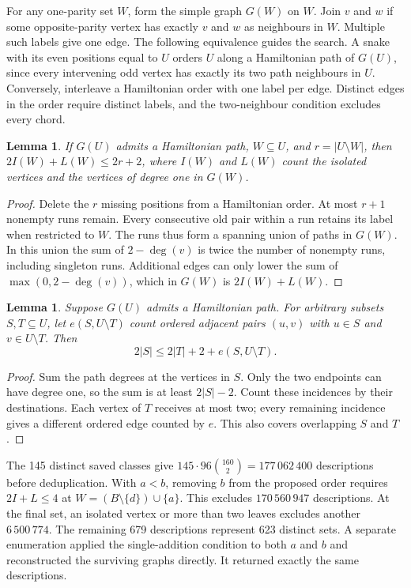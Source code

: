 \documentclass[11pt,a4paper]{article}
\newtheorem{lemma}[theorem]{Lemma}
\theoremstyle{definition}
\theoremstyle{remark}
\begin{document}
For any one-parity set $W$, form the simple graph $G(W)$ on $W$.
Join $v$ and $w$ if some opposite-parity vertex has exactly $v$ and $w$
as neighbours in $W$. Multiple such labels give one edge.
The following equivalence guides the search. A snake
with its even positions equal to $U$ orders $U$ along a Hamiltonian
path of $G(U)$, since every intervening odd vertex has exactly its two
path neighbours in $U$. Conversely, interleave a Hamiltonian order
with one label per edge. Distinct edges in the order require distinct
labels, and the two-neighbour condition excludes every chord.

\begin{lemma}\label{lem:partial237}
If $G(U)$ admits a Hamiltonian path, $W\subseteq U$, and $r=|U\setminus W|$,
then $2I(W)+L(W)\le 2r+2$, where $I(W)$ and $L(W)$ count the isolated
vertices and the vertices of degree one in $G(W)$.
\end{lemma}
\begin{proof}
Delete the $r$ missing positions from a Hamiltonian order. At most
$r+1$ nonempty runs remain. Every consecutive old pair within a run
retains its label when restricted to $W$. The runs thus form a spanning
union of paths in $G(W)$. In this union the sum of $2-\deg(v)$ is twice
the number of nonempty runs, including singleton runs. Additional edges
can only lower the sum of $\max(0,2-\deg(v))$, which in $G(W)$ is
$2I(W)+L(W)$.
\end{proof}

\begin{lemma}\label{lem:cut237}
Suppose $G(U)$ admits a Hamiltonian path. For arbitrary subsets
$S,T\subseteq U$, let $e(S,U\setminus T)$ count ordered adjacent pairs
$(u,v)$ with $u\in S$ and $v\in U\setminus T$. Then
\[
 2|S|\le 2|T|+2+e(S,U\setminus T).
\]
\end{lemma}
\begin{proof}
Sum the path degrees at the vertices in $S$. Only the two endpoints can
have degree one, so the sum is at least $2|S|-2$. Count these incidences
by their destinations. Each vertex of $T$ receives at most two; every
remaining incidence gives a different ordered edge counted by $e$.
This also covers overlapping $S$ and $T$.
\end{proof}

The 145 distinct saved classes give
$145\cdot96\binom{160}{2}=177\,062\,400$ descriptions before
deduplication. With $a<b$, removing $b$ from the proposed order requires
$2I+L\le4$ at $W=(B\setminus\{d\})\cup\{a\}$. This excludes
$170\,560\,947$ descriptions. At the final set, an isolated vertex or
more than two leaves excludes another $6\,500\,774$. The remaining
679 descriptions represent 623 distinct sets. A separate enumeration
applied the single-addition condition to both $a$ and $b$ and reconstructed
the surviving graphs directly. It returned exactly the same descriptions.
\end{document}
